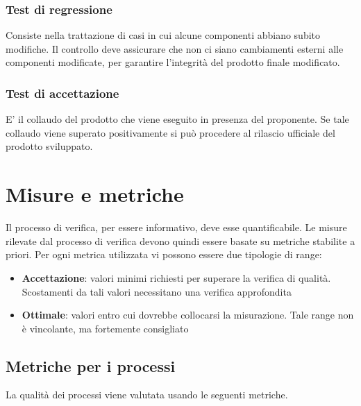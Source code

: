 \documentclass[12pt,a4paper]{article}
\begin{document}
\subsubsection{Test di regressione}
Consiste nella trattazione di casi in cui alcune componenti abbiano subito modifiche. Il controllo deve assicurare che non ci siano cambiamenti esterni alle componenti modificate, per garantire l'integrità del prodotto finale modificato.
\subsubsection{Test di accettazione}
E' il collaudo del prodotto  che viene eseguito in presenza del proponente. Se tale collaudo viene superato positivamente si può procedere al rilascio ufficiale del prodotto sviluppato. 

\newpage
\section{Misure e metriche}\label{metriche}
Il processo di verifica, per essere informativo, deve esse quantificabile. Le misure rilevate dal processo di verifica devono quindi essere basate su metriche stabilite a priori. Per ogni metrica utilizzata vi possono essere due tipologie di range:
\begin{itemize}
\item \textbf{Accettazione}: valori minimi richiesti per superare la verifica di qualità. Scostamenti da tali valori necessitano una verifica approfondita
\item \textbf{Ottimale}: valori entro cui dovrebbe collocarsi la misurazione. Tale range non è vincolante, ma fortemente consigliato
\end{itemize}

\subsection{Metriche per i processi}\label{metriche_processi}
La qualità dei processi viene valutata usando le seguenti metriche.
\end{document}
